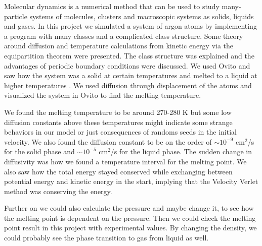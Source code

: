 Molecular dynamics is a numerical method that can be used to study many-particle systems of molecules, clusters and macroscopic systems as solids, liquids and gases. In this project we simulated a system of argon atoms by implementing a program with many classes and a complicated class structure. Some theory around diffusion and temperature calculations from kinetic energy via the equipartition theorem were presented. The class structure was explained and the advantages of periodic boundary conditions were discussed. We used Ovito and saw how the system was a solid at certain temperatures and melted to a liquid at higher temperatures \cite{ovito} . We used diffusion through displacement of the atoms and visualized the system in Ovito to find the melting temperature. 

We found the melting temperature to be around 270-280 K but some low diffusion constants above these temperatures might indicate some strange behaviors in our model or just consequences of randoms seeds in the initial velocity. We also found the diffusion constant to be on the order of $\sim 10^{-9}$ cm$^2$/s for the solid phase and $\sim 10^{-5}$ cm$^2$/s for the liquid phase. The sudden change in diffusivity was how we found a temperature interval for the melting point. We also saw how the total energy stayed conserved while exchanging between potential energy and kinetic energy in the start, implying that the Velocity Verlet method was conserving the energy. 

Further on we could also calculate the pressure and maybe change it, to see how the melting point is dependent on the pressure. Then we could check the melting point result in this project with experimental values. By changing the density, we could probably see the phase transition to gas from liquid as well. 
